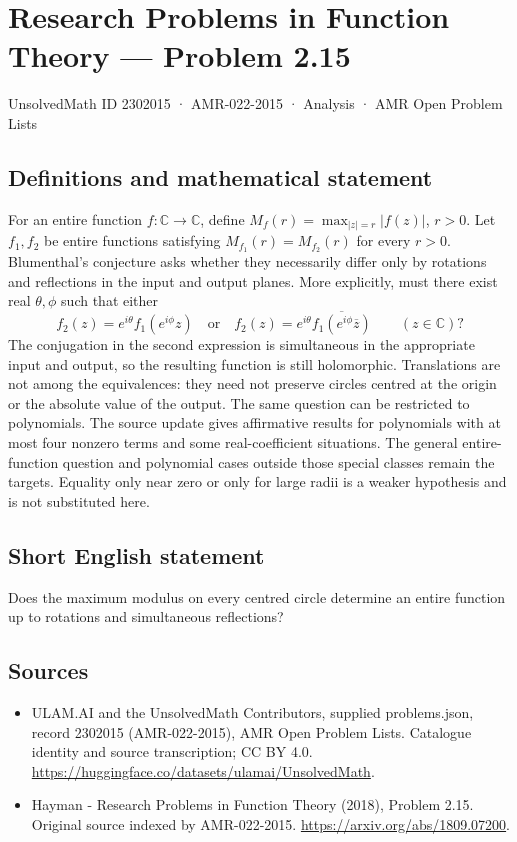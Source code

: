 \documentclass[11pt,a4paper]{article}
\begin{document}
\section*{Research Problems in Function Theory — Problem 2.15}\label{2302015}
{\small UnsolvedMath ID 2302015 · AMR-022-2015 · Analysis · AMR Open Problem Lists}
\subsection{Definitions and mathematical statement}
For an entire function $f:\mathbb C\to\mathbb C$, define
$M_f(r)=\max_{|z|=r}|f(z)|$, $r>0$. Let $f_1,f_2$ be entire functions satisfying $M_{f_1}(r)=M_{f_2}(r)$ for every $r>0$.
Blumenthal's conjecture asks whether they necessarily differ only by rotations and reflections in the input and output planes. More explicitly, must there exist real $\theta,\phi$ such that either
\[
f_2(z)=e^{i\theta}f_1(e^{i\phi}z)
\quad\text{or}\quad
f_2(z)=e^{i\theta}\overline{f_1(e^{i\phi}\overline z)}
\qquad(z\in\mathbb C)?
\]
The conjugation in the second expression is simultaneous in the appropriate input and output, so the resulting function is still holomorphic. Translations are not among the equivalences: they need not preserve circles centred at the origin or the absolute value of the output.
The same question can be restricted to polynomials. The source update gives affirmative results for polynomials with at most four nonzero terms and some real-coefficient situations. The general entire-function question and polynomial cases outside those special classes remain the targets. Equality only near zero or only for large radii is a weaker hypothesis and is not substituted here.
\subsection{Short English statement}
Does the maximum modulus on every centred circle determine an entire function up to rotations and simultaneous reflections?
\subsection{Sources}
\begin{itemize}
\item[S1] ULAM.AI and the UnsolvedMath Contributors, supplied problems.json, record 2302015 (AMR-022-2015), AMR Open Problem Lists. Catalogue identity and source transcription; CC BY 4.0.
\url{https://huggingface.co/datasets/ulamai/UnsolvedMath}.
\item[S2] Hayman - Research Problems in Function Theory (2018), Problem 2.15. Original source indexed by AMR-022-2015.
\url{https://arxiv.org/abs/1809.07200}.
\end{itemize}
\end{document}
